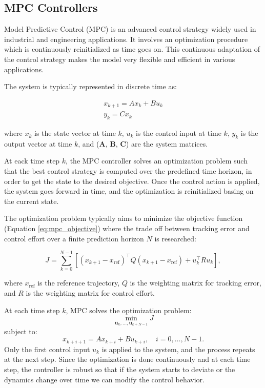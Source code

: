 \subsection{MPC Controllers}
\label{subsec:mpc_controllers}

Model Predictive Control (MPC) is an advanced control strategy widely used in industrial and engineering applications. It involves an optimization procedure which is continuously reinitialized as time goes on. This continuous adaptation of the control strategy makes the model very flexible and efficient in various applications.

The system is typically represented in discrete time as:

\begin{equation}
    \begin{aligned}
        x_{k+1}=Ax_{k}+Bu_{k} \\
        y_{k}=Cx_{k}
    \end{aligned}
\end{equation}

where $x_k$ is the state vector at time \( k \), $u_k$ is the control input at time \( k \), $y_k$ is the output vector at time \( k \), and ($\mathbf{A}$, $\mathbf{B}$, $\mathbf{C}$) are the system matrices.

At eack time step $k$, the MPC controller solves an optimization problem such that the best control strategy is computed over the predefined time horizon, in order to get the state to the desired objective. Once the control action is applied, the system goes forward in time, and the optimization is reinitialized basing on the current state.

The optimization problem typically aims to minimize the objective function (Equation \ref{eq:mpc_objective}) where the trade off between tracking error and control effort over a finite prediction horizon \( N \) is researched:

\begin{equation}
    J = \sum_{k=0}^{N-1} \left[ (x_{k+1} - x_{\text{ref}})^\top Q (x_{k+1} - x_{\text{ref}}) + u_k^\top R u_k \right],
    \label{eq:mpc_objective}
\end{equation}

where $x_{\text{ref}}$ is the reference trajectory, $Q$ is the weighting matrix for tracking error, and $R$ is the weighting matrix for control effort.

At each time step \( k \), MPC solves the optimization problem:
\[
    \min_{\mathbf{u}_k, \ldots, \mathbf{u}_{k+N-1}} J
\]
subject to:
\[
    x_{k+i+1} = A x_{k+i} + B u_{k+i}, \quad i = 0, \ldots, N-1.
\]
Only the first control input \(u_k \) is applied to the system, and the process repeats at the next step. Since the optimization is done continuously and at each time step, the controller is robust so that if the system starts to deviate or the dynamics change over time we can modify the control behavior.


